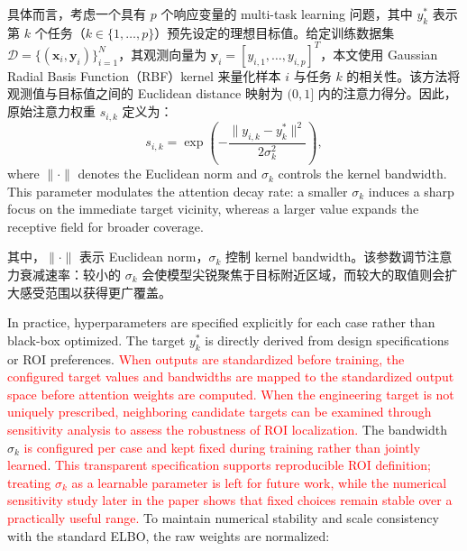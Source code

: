 \documentclass[11pt]{article}
\begin{document}
具体而言，考虑一个具有 $p$ 个响应变量的 multi-task learning 问题，其中 $y_{k}^{*}$ 表示第 $k$ 个任务（$k \in \{1, \ldots, p\}$）预先设定的理想目标值。给定训练数据集 $\mathcal{D}=\{(\mathbf{x}_{i}, \mathbf{y}_{i})\}_{i=1}^{N}$，其观测向量为 $\mathbf{y}_{i}=[y_{i,1}, \ldots, y_{i,p}]^{T}$，本文使用 Gaussian Radial Basis Function（RBF）kernel 来量化样本 $i$ 与任务 $k$ 的相关性。该方法将观测值与目标值之间的 Euclidean distance 映射为 $(0, 1]$ 内的注意力得分。因此，原始注意力权重 $s_{i,k}$ 定义为：
\begin{equation}
	{{s}_{i,k}}=\exp \left( -\frac{\|{{y}_{i,k}}-y_{k}^{*}{{\|}^{2}}}{2\sigma _{k}^{2}} \right),
\end{equation}
where $\|\cdot\|$ denotes the Euclidean norm and $\sigma_{k}$ controls the kernel bandwidth. This parameter modulates the attention decay rate: a smaller $\sigma_{k}$ induces a sharp focus on the immediate target vicinity, whereas a larger value expands the receptive field for broader coverage.

其中，$\|\cdot\|$ 表示 Euclidean norm，$\sigma_{k}$ 控制 kernel bandwidth。该参数调节注意力衰减速率：较小的 $\sigma_{k}$ 会使模型尖锐聚焦于目标附近区域，而较大的取值则会扩大感受范围以获得更广覆盖。

In practice, hyperparameters are specified explicitly for each case rather than black-box optimized. The target $y_{k}^{*}$ is directly derived from design specifications or ROI preferences. \textcolor{red}{When outputs are standardized before training, the configured target values and bandwidths are mapped to the standardized output space before attention weights are computed. When the engineering target is not uniquely prescribed, neighboring candidate targets can be examined through sensitivity analysis to assess the robustness of ROI localization.} The bandwidth $\sigma_{k}$ \textcolor{red}{is configured per case and kept fixed during training rather than jointly learned}. \textcolor{red}{This transparent specification supports reproducible ROI definition; treating $\sigma_{k}$ as a learnable parameter is left for future work, while the numerical sensitivity study later in the paper shows that fixed choices remain stable over a practically useful range.} To maintain numerical stability and scale consistency with the standard ELBO, the raw weights are normalized:
\end{document}
